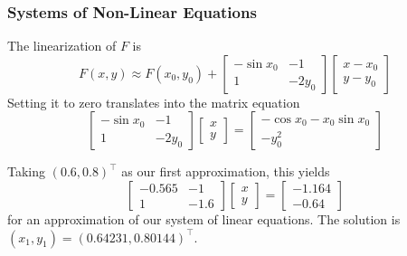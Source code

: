 \documentclass[xcolor=dvipsnames]{beamer}
\begin{document}
\begin{frame}
  \frametitle{Systems of Non-Linear Equations}
  The linearization of $F$ is
  \begin{equation}
    \label{eq:thaitofe}
    F(x,y)\approx{}F(x_{0},y_{0})+\left[
      \begin{array}{cc}
        -\sin{}x_{0} & -1 \\
                 1&-2y_{0}
      \end{array}\right]\left[
      \begin{array}{c}
        x-x_{0} \\
        y-y_{0}
      \end{array}\right]
  \end{equation}
  Setting it to zero translates into the matrix equation
  \begin{equation}
    \label{eq:ooyaiche}
    \left[
    \begin{array}{cc}
      -\sin{}x_{0}&-1 \\
                  1&-2y_{0}
    \end{array}\right]\left[
    \begin{array}{c}
      x \\
      y
    \end{array}\right]=\left[
    \begin{array}{c}
      -\cos{}x_{0}-x_{0}\sin{}x_{0} \\
      -y_{0}^{2}
    \end{array}\right]
  \end{equation}

  Taking $(0.6,0.8)^{\intercal}$ as our first approximation, this yields
  \begin{equation}
    \label{eq:foovixah}
    \left[
      \begin{array}{cc}
        -0.565&-1 \\
              1&-1.6
      \end{array}\right]\left[
      \begin{array}{c}
        x \\
        y
      \end{array}\right]=\left[
      \begin{array}{c}
        -1.164 \\
        -0.64
      \end{array}\right]
  \end{equation}
for an approximation of our system of linear equations. The solution
is $(x_{1},y_{1})=(0.64231,0.80144)^{\intercal}$. 
\end{frame}
\end{document}
